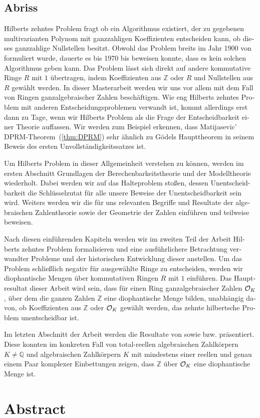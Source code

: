 \begin{german}
\section*{Abriss}

Hilberts zehntes Problem fragt ob ein Algorithmus existiert, der zu gegebenen
multivarianten Polynom mit ganzzahligen Koeffizienten entscheiden kann, ob
dieses ganzzahlige Nullstellen besitzt. Obwohl das Problem breits im Jahr 1900
von \textcite{Hilbert1900} formuliert wurde, dauerte es bis 1970 bis
\textcite{Matijasevic1970} beweisen konnte, dass es kein solchen Algorithmus
geben kann. Das Problem lässt sich direkt auf andere kommutative Ringe \(R\) mit
\(1\) übertragen, indem Koeffizienten aus \(ℤ\) oder \(R\) und Nullstellen aus
\(R\) gewählt werden. In dieser Masterarbeit werden wir uns vor allem mit dem
Fall von Ringen ganzalgebraischer Zahlen beschäftigen. Wie eng Hilberts zehntes
Problem mit anderen Entscheidungsproblemen verwandt ist, kommt allerdings erst
dann zu Tage, wenn wir Hilberts Problem als die Frage der Entscheidbarkeit einer
Theorie auffassen. Wir werden zum Beispiel erkennen, dass Matijasevic'
\textsc{DPRM}-Theorem~(\ref{thm:DPRM}) sehr ähnlich zu Gödels Haupttheorem in
seinem Beweis \cite{Goedel1931} des ersten Unvollständigkeitssatzes ist.

Um Hilberts Problem in dieser Allgemeinheit verstehen zu können, werden im
ersten Abschnitt Grundlagen der Berechenbarkeitstheorie und der Modelltheorie
wiederholt. Dabei werden wir auf das Halteproblem stoßen, dessen
Unentscheidbarkeit die Schlüsselzutat für alle unsere Beweise der
Unentscheidbarkeit sein wird. Weiters werden wir die für uns relevanten Begriffe
und Resultate der algebraischen Zahlentheorie sowie der Geometrie der Zahlen
einführen und teilweise beweisen.

Nach diesen einführenden Kapiteln werden wir im zweiten Teil der Arbeit Hilberts
zehntes Problem formalisieren und eine ausführlichere Betrachtung verwandter
Probleme und der historischen Entwicklung dieser anstellen. Um das Problem
schließlich negativ für ausgewählte Ringe zu entscheiden, werden wir
diophantische Mengen über kommutativen Ringen \(R\) mit \(1\) einführen. Das
Hauptresultat dieser Arbeit wird sein, dass für einen Ring ganzalgebraischer
Zahlen \(\mathcal{O}_{K}\), über dem die ganzen Zahlen \(ℤ\) eine diophantische Menge
bilden, unabhängig davon, ob Koeffizienten aus \(ℤ\) oder \(\mathcal{O}_{K}\) gewählt
werden, das zehnte hilbertsche Problem unentscheidbar ist.

Im letzten Abschnitt der Arbeit werden die Resultate von \textcite{Denef1980}
sowie \textcite{Pheidas1988} bzw. \textcite{Shapiro1989} präsentiert. Diese
konnten im konkreten Fall von total-reellen algebraischen Zahlkörpern \(K ≠ ℚ\)
und algebraischen Zahlkörpern \(K\) mit mindestens einer reellen und genau einem
Paar komplexer Einbettungen zeigen, dass \(ℤ\) über \(\mathcal{O}_{K}\) eine
diophantische Menge ist.
\end{german}

\vspace{1.5cm}

\section*{Abstract}
\newpage
\thispagestyle{empty}
\tableofcontents
